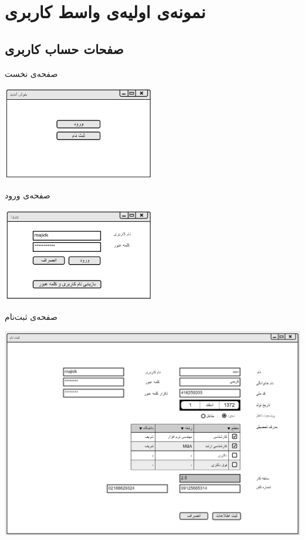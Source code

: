 \newpage
\section{نمونه‌ی اولیه‌ی واسط کاربری}

\subsection{صفحات حساب کاربری}

\vspace{1cm}
صفحه‌ی نخست
\begin{center}
\includegraphics[width=0.5\textwidth]{Prototype/Accounting/HomePage.png}
\end{center}

\vspace{1cm}
صفحه‌ی ورود
\begin{center}
\includegraphics[width=0.5\textwidth]{Prototype/Accounting/Login.png}
\end{center}

\newpage
\vspace{1cm}
صفحه‌ی ثبت‌نام
\begin{center}
\includegraphics[width=\textwidth]{Prototype/Accounting/Register.png}
\end{center}

